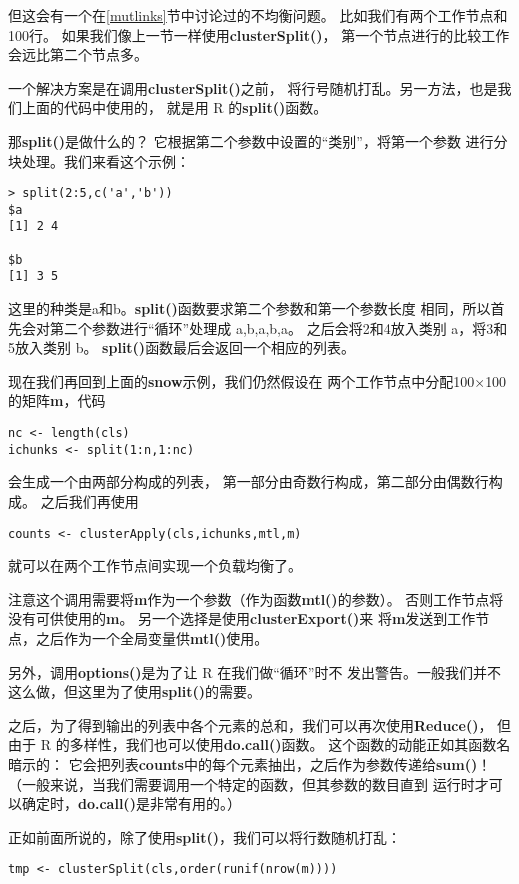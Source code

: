 但这会有一个在\ref{mutlinks}节中讨论过的不均衡问题。
比如我们有两个工作节点和100行。
如果我们像上一节一样使用{\bf clusterSplit()}，
第一个节点进行的比较工作会远比第二个节点多。

一个解决方案是在调用{\bf clusterSplit()}之前，
将行号随机打乱。另一方法，也是我们上面的代码中使用的，
就是用 R 的{\bf split()}函数。

那{\bf split()}是做什么的？
它根据第二个参数中设置的``类别''，将第一个参数
进行分块处理。我们来看这个示例：

\begin{lstlisting}
> split(2:5,c('a','b'))
$a
[1] 2 4

$b
[1] 3 5
\end{lstlisting}

这里的种类是a和b。{\bf split()}函数要求第二个参数和第一个参数长度
相同，所以首先会对第二个参数进行``循环''处理成 a,b,a,b,a。
之后会将2和4放入类别 a，将3和5放入类别 b。
{\bf split()}函数最后会返回一个相应的列表。

现在我们再回到上面的{\bf snow}示例，我们仍然假设在
两个工作节点中分配100$\times$100的矩阵{\bf m}，代码
\begin{lstlisting}
nc <- length(cls)
ichunks <- split(1:n,1:nc)
\end{lstlisting}
会生成一个由两部分构成的列表，
第一部分由奇数行构成，第二部分由偶数行构成。
之后我们再使用
\begin{lstlisting}
counts <- clusterApply(cls,ichunks,mtl,m)
\end{lstlisting}
就可以在两个工作节点间实现一个负载均衡了。

注意这个调用需要将{\bf m}作为一个参数（作为函数{\bf mtl()}的参数）。
否则工作节点将没有可供使用的{\bf m}。
另一个选择是使用{\bf clusterExport()}来
将{\bf m}发送到工作节点，之后作为一个全局变量供{\bf mtl()}使用。

另外，调用{\bf options()}是为了让 R 在我们做``循环''时不
发出警告。一般我们并不这么做，但这里为了使用{\bf split()}的需要。

之后，为了得到输出的列表中各个元素的总和，我们可以再次使用{\bf Reduce()}，
但由于 R 的多样性，我们也可以使用{\bf do.call()}函数。
这个函数的动能正如其函数名暗示的：
它会把列表{\bf counts}中的每个元素抽出，之后作为参数传递给{\bf sum()}！
（一般来说，当我们需要调用一个特定的函数，但其参数的数目直到
运行时才可以确定时，{\bf do.call()}是非常有用的。）

正如前面所说的，除了使用{\bf split()}，我们可以将行数随机打乱：

\begin{lstlisting}
tmp <- clusterSplit(cls,order(runif(nrow(m))))
\end{lstlisting}

